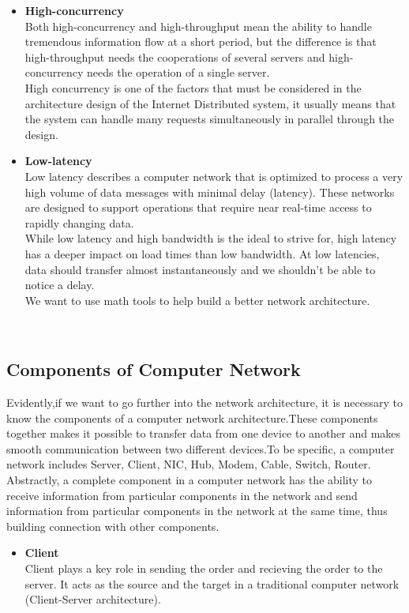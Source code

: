 \documentclass{elegantpaper}
\begin{document}
\begin{itemize}[noitemsep]\item\textbf{High-concurrency}\\
Both high-concurrency and high-throughput mean the ability to handle tremendous information flow at a short period, but the difference is that high-throughput needs the cooperations of several servers and high-concurrency needs the operation of a single server.\\
High concurrency is one of the factors that must be considered in the architecture design of the Internet Distributed system, it usually means that the system can handle many requests simultaneously in parallel through the design.\end{itemize}

\begin{itemize}[noitemsep]\item\textbf{Low-latency}\\
Low latency describes a computer network that is optimized to process a very high volume of data messages with minimal delay (latency). These networks are designed to support operations that require near real-time access to rapidly changing data.\\
While low latency and high bandwidth is the ideal to strive for, high latency has a deeper impact on load times than low bandwidth. At low latencies, data should transfer almost instantaneously and we shouldn't be able to notice a delay.\\
We want to use math tools to help build a better network architecture.
\end{itemize}\\

\subsection{Components of Computer Network}
Evidently,if we want to go further into the network architecture, it is necessary to know the components of a computer network architecture.These components together makes it possible to transfer data from one device to another and makes smooth communication between two different devices.To be specific, a computer network includes Server, Client, NIC, Hub, Modem, Cable, Switch, Router.\\
 \quad Abstractly, a complete component in a computer network has the ability to receive information from particular components in the network and send information from particular components in the network at the same time, thus building connection with other components.\\
 \begin{itemize}[noitemsep]\item\textbf{Client}\\
 Client plays a key role in sending the order and recieving the order to the server. It acts as the source and the target in a traditional computer network (Client-Server architecture).
 \end{itemize}
 
\end{document}
